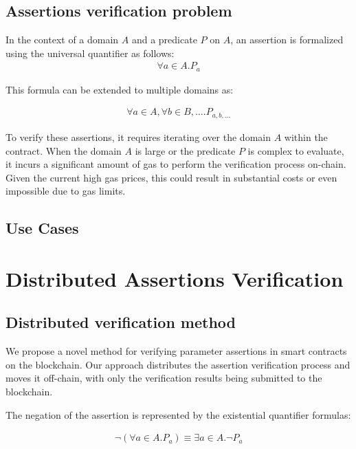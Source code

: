 \documentclass[runningheads]{llncs}
\begin{document}
\subsection{Assertions verification problem}

In the context of a domain $A$ and a predicate $P$ on $A$, an assertion is formalized using the universal quantifier as follows:
\begin{gather}
  \label{eq:1}
\forall a \in A. P_{a}
\end{gather}

This formula can be extended to multiple domains as:

\begin{gather}
\label{eq:2}
\forall a \in A, \forall b \in B, \dots .P_{a, b, \dots}
\end{gather} 



To verify these assertions, it requires iterating over the domain $A$ within the contract. When the domain $A$ is large or the predicate $P$ is complex to evaluate, it incurs a significant amount of gas to perform the verification process on-chain.  Given the current high gas prices, this could result in substantial costs or even impossible due to gas limits. 
\subsection{Use Cases}

\section{Distributed Assertions Verification}
\label{sec:distributed-assertion-verification}
\subsection{Distributed verification method}
We propose a novel method for verifying parameter assertions in smart contracts on the blockchain. Our approach distributes the assertion verification process and moves it off-chain, with only the verification results being submitted to the blockchain.

The negation of the assertion is represented by the existential quantifier formulas:

\begin{gather}
\label{eq:3}
\neg (\forall a \in A. P_{a}) \equiv \exists a \in A. \neg P_{a}
\end{gather}
\end{document}
